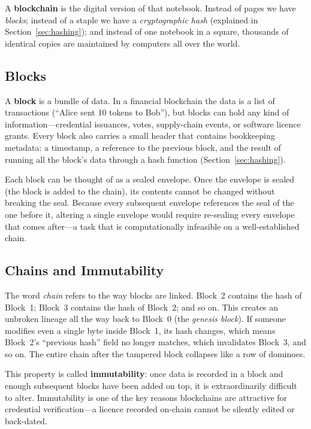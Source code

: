 A \textbf{blockchain} is the digital version of that notebook.  Instead of
pages we have \emph{blocks}; instead of a staple we have a
\emph{cryptographic hash} (explained in Section~\ref{sec:hashing}); and
instead of one notebook in a square, thousands of identical copies are
maintained by computers all over the world.

\subsection{Blocks}

A \textbf{block} is a bundle of data.  In a financial blockchain the data is
a list of transactions (``Alice sent 10 tokens to Bob''), but blocks can hold
any kind of information---credential issuances, votes, supply-chain events,
or software licence grants.  Every block also carries a small header that
contains bookkeeping metadata: a timestamp, a reference to the previous
block, and the result of running all the block's data through a hash function
(Section~\ref{sec:hashing}).

Each block can be thought of as a sealed envelope.  Once the envelope is
sealed (the block is added to the chain), its contents cannot be changed
without breaking the seal.  Because every subsequent envelope references the
seal of the one before it, altering a single envelope would require
re-sealing every envelope that comes after---a task that is computationally
infeasible on a well-established chain.

\subsection{Chains and Immutability}

The word \emph{chain} refers to the way blocks are linked.  Block~2 contains
the hash of Block~1; Block~3 contains the hash of Block~2; and so on.  This
creates an unbroken lineage all the way back to Block~0 (the \emph{genesis
block}).  If someone modifies even a single byte inside Block~1, its hash
changes, which means Block~2's ``previous hash'' field no longer matches,
which invalidates Block~3, and so on.  The entire chain after the tampered
block collapses like a row of dominoes.

This property is called \textbf{immutability}: once data is recorded in a
block and enough subsequent blocks have been added on top, it is
extraordinarily difficult to alter.  Immutability is one of the key reasons
blockchains are attractive for credential verification---a licence recorded
on-chain cannot be silently edited or back-dated.

